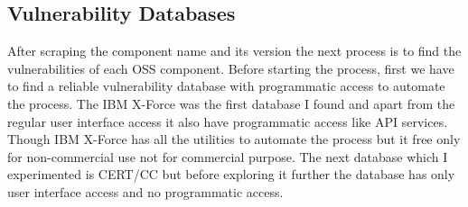 \subsection{Vulnerability Databases}
After scraping the component name and its version the next process is to find the vulnerabilities of each \acs{OSS} component. Before starting the process, first we have to find a reliable vulnerability database with programmatic access to automate the process. The IBM X-Force was the first database I found and apart from the regular user interface access it also have programmatic access like API services. Though IBM X-Force has all the utilities to automate the process but it free only for non-commercial use not for commercial purpose. The next database which I experimented is CERT/CC but before exploring it further the database has only user interface access and no programmatic access.
